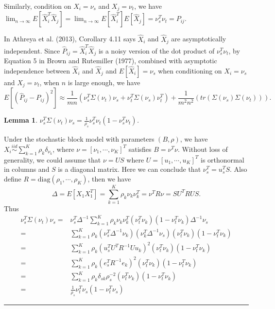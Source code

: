 \documentclass[a4paper]{article}
\newenvironment{proof}{{\bf Proof:  }}{\hfill\rule{2mm}{2mm}}
\newtheorem{lemma}[fact]{Lemma}
\begin{document}
Similarly, condition on $X_i = \nu_s$ and $X_j = \nu_t$, we have $\lim_{n\to\infty}E[\hat{X}_i^T \hat{X}_j] = \lim_{n\to\infty}E[\hat{X}_i^T] E[\hat{X}_j] = \nu_s^T \nu_t = P_{ij}$.




In Athreya et al. (2013), Corollary 4.11 says $\hat{X}_i$ and $\hat{X}_j$ are asymptotically independent. Since $\hat{P}_{ij} = \hat{X}_i^T \hat{X}_j$ is a noisy version of the dot product of $\nu_s^T \nu_t$, by Equation 5 in Brown and Rutemiller (1977), combined with asymptotic independence between $\hat{X}_i$ and $\hat{X}_j$ and $E[\hat{X}_i] = \nu_s$ when conditioning on $X_i = \nu_s$ and $X_j = \nu_t$, when $n$ is large enough, we have
\begin{equation}
\label{eqn:1}
	E[(\hat{P}_{ij} - P_{ij})^2] \approx
    \frac{1}{m n} \left( \nu_s^T \Sigma(\nu_t) \nu_s + \nu_t^T \Sigma(\nu_s) \nu_t^T \right)
    + \frac{1}{m^2 n^2} \left( tr(\Sigma(\nu_s) \Sigma(\nu_t)) \right).
\end{equation}


\begin{lemma}
\label{lemma:mseForm}
$\nu_s^T \Sigma(\nu_t) \nu_s = \frac{1}{\rho_s} \nu_s^T \nu_t (1- \nu_s^T \nu_t)$.
\end{lemma}
\begin{proof}
Under the stochastic block model with parameters $(B, \rho)$, we have $X_i \stackrel{iid}{\sim} \sum_{k=1}^K \rho_k \delta_{\nu_k}$, where $\nu = [\nu_1, \cdots, \nu_K]^T$ satisfies $B = \nu^T \nu$. Without loss of generality, we could assume that $\nu = U S$ where $U = [u_1, \cdots, u_K]^T$ is orthonormal in columns and $S$ is a diagonal matrix. Here we can conclude that $\nu_s^T = u_s^T S$. Also define $R = \text{diag}(\rho_1, \cdots, \rho_K)$, then we have
\[
	\Delta = E[X_1 X_1^T] = \sum_{k=1}^K \rho_k \nu_k \nu_k^T = \nu^T R \nu = S U^T R U S.
\]
Thus
\begin{align*}
	\nu_s^T \Sigma(\nu_t) \nu_s = &
    \nu_s^T \Delta^{-1} \sum_{k=1}^K \rho_k \nu_k \nu_k^T (\nu_t^T \nu_k)(1 - \nu_t^T \nu_k) \Delta^{-1} \nu_s \\
    = & \sum_{k=1}^K \rho_k (\nu_s^T \Delta^{-1} \nu_k) (\nu_k^T \Delta^{-1} \nu_s) (\nu_t^T \nu_k) (1 - \nu_t^T \nu_k) \\
    = & \sum_{k=1}^K \rho_k (u_s^T U^T R^{-1} U u_k)^2 (\nu_t^T \nu_k) (1 - \nu_t^T \nu_k) \\
    = & \sum_{k=1}^K \rho_k (e_s^T R^{-1} e_k)^2 (\nu_t^T \nu_k) (1 - \nu_t^T \nu_k) \\
    = & \sum_{k=1}^K \rho_k \delta_{sk} \rho_s^{-2} (\nu_t^T \nu_k) (1 - \nu_t^T \nu_k) \\
    = & \frac{1}{\rho_s} \nu_t^T \nu_s (1 - \nu_t^T \nu_s)
\end{align*}
\end{proof}
\end{document}
